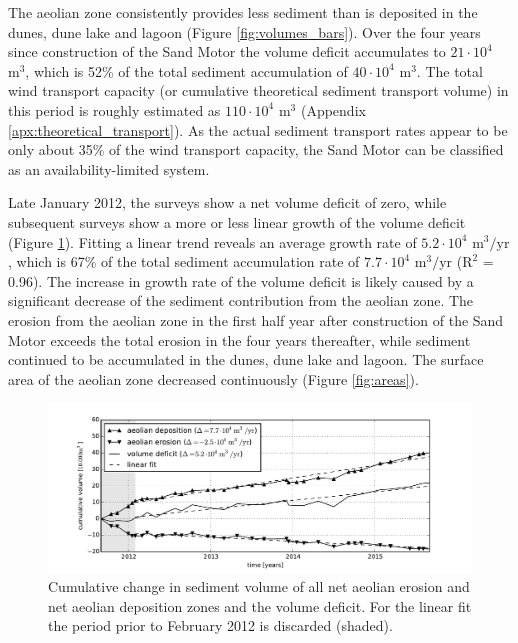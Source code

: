 The aeolian zone consistently provides less sediment than is deposited
in the dunes, dune lake and lagoon (Figure
\ref{fig:volumes_bars}). Over the four years since construction of the
Sand Motor the volume deficit accumulates to $\mathrm{21 \cdot 10^4}$
$\mathrm{m^3}$, which is 52\% of the total sediment accumulation of
$\mathrm{40 \cdot 10^4}$ $\mathrm{m^3}$. The total wind transport
capacity (or cumulative theoretical sediment transport volume) in this
period is roughly estimated as $\mathrm{110 \cdot 10^4}$
$\mathrm{m^3}$ (Appendix \ref{apx:theoretical_transport}). As the
actual sediment transport rates appear to be only about 35\% of the
wind transport capacity, the Sand Motor can be classified as an
availability-limited system.

Late January 2012, the surveys show a net volume deficit of zero,
while subsequent surveys show a more or less linear growth of the
volume deficit (Figure \ref{fig:netvolumechange}). Fitting a linear
trend reveals an average growth rate of $\mathrm{5.2 \cdot 10^4}$
$\mathrm{m^3/yr}$, which is 67\% of the total sediment accumulation
rate of $\mathrm{7.7 \cdot 10^4}$ $\mathrm{m^3/yr}$ ($\mathrm{R^2}$ =
0.96). The increase in growth rate of the volume deficit is likely
caused by a significant decrease of the sediment contribution from the
aeolian zone. The erosion from the aeolian zone in the first half year
after construction of the Sand Motor exceeds the total erosion in the
four years thereafter, while sediment continued to be accumulated in
the dunes, dune lake and lagoon. The surface area of the aeolian zone
decreased continuously (Figure \ref{fig:areas}).

\begin{figure}
 \centering
  \includegraphics[width=\columnwidth]{../Figures/netvolumechange}
  \caption{Cumulative change in sediment volume of all net aeolian
    erosion and net aeolian deposition zones and the volume
    deficit. For the linear fit the period prior to February 2012 is
    discarded (shaded).}
  \label{fig:netvolumechange}
\end{figure}

